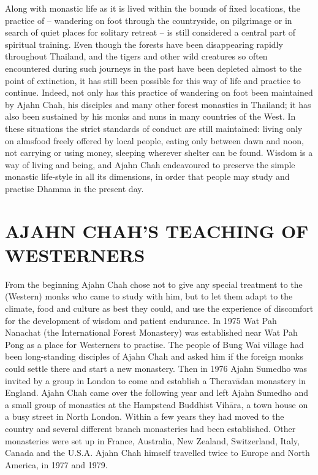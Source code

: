 Along with monastic life as it is lived within the bounds of fixed locations, the practice of  -- wandering on foot through the countryside, on pilgrimage or in search of quiet places for solitary retreat -- is still considered a central part of spiritual training. Even though the forests have been disappearing rapidly throughout Thailand, and the tigers and other wild creatures so often encountered during such  journeys in the past have been depleted almost to the point of extinction, it has still been possible for this way of life and practice to continue. Indeed, not only has this practice of wandering on foot been maintained by Ajahn Chah, his disciples and many other forest monastics in Thailand; it has also been sustained by his monks and nuns in many countries of the West. In these situations the strict standards of conduct are still maintained: living only on almsfood freely offered by local people, eating only between dawn and noon, not carrying or using money, sleeping wherever shelter can be found. Wisdom is a way of living and being, and Ajahn Chah endeavoured to preserve the simple monastic life-style in all its dimensions, in order that people may study and practise Dhamma in the present day.

\section{AJAHN CHAH'S TEACHING OF WESTERNERS}

\vspace*{0.4\baselineskip}
From the beginning Ajahn Chah chose not to give any special treatment to the  (Western) monks who came to study with him, but to let them adapt to the climate, food and culture as best they could, and use the experience of discomfort for the development of wisdom and patient endurance. In 1975 Wat Pah Nanachat (the International Forest Monastery) was established near Wat Pah Pong as a place for Westerners to practise. The people of Bung Wai village had been long-standing disciples of Ajahn Chah and asked him if the foreign monks could settle there and start a new monastery. Then in 1976 Ajahn Sumedho was invited by a group in London to come and establish a Therav\=adan monastery in England. Ajahn Chah came over the following year and left Ajahn Sumedho and a small group of monastics at the Hampstead Buddhist Vih\=ara, a town house on a busy street in North London. Within a few years they had moved to the country and several different branch monasteries had been established. Other monasteries were set up in France, Australia, New Zealand, Switzerland, Italy, Canada and the U.S.A. Ajahn Chah himself travelled twice to Europe and North America, in 1977 and 1979.

